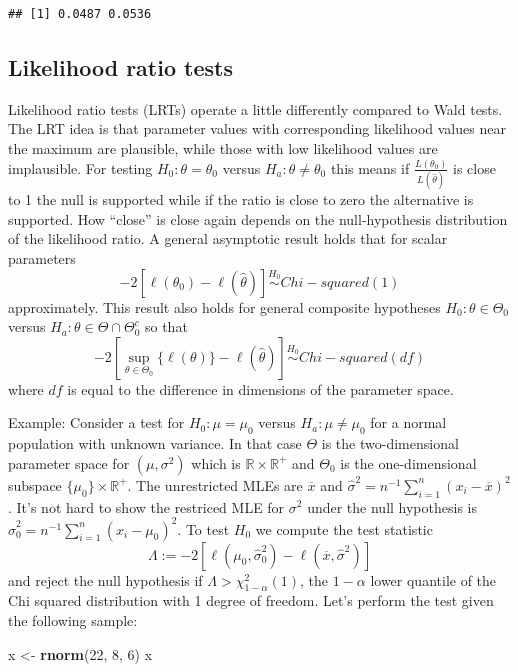 \documentclass[]{book}
\newenvironment{Shaded}{\begin{snugshade}}{\end{snugshade}}
\newcommand{\KeywordTok}[1]{\textcolor[rgb]{0.13,0.29,0.53}{\textbf{{#1}}}}
\newcommand{\DecValTok}[1]{\textcolor[rgb]{0.00,0.00,0.81}{{#1}}}
\newcommand{\StringTok}[1]{\textcolor[rgb]{0.31,0.60,0.02}{{#1}}}
\newcommand{\NormalTok}[1]{{#1}}
\begin{document}
\begin{verbatim}
## [1] 0.0487 0.0536
\end{verbatim}

\subsection{Likelihood ratio tests}\label{likelihood-ratio-tests}

Likelihood ratio tests (LRTs) operate a little differently compared to
Wald tests. The LRT idea is that parameter values with corresponding
likelihood values near the maximum are plausible, while those with low
likelihood values are implausible. For testing \(H_0:\theta = \theta_0\)
versus \(H_a:\theta\ne \theta_0\) this means if
\(\frac{L(\theta_0)}{L(\hat\theta)}\) is close to 1 the null is
supported while if the ratio is close to zero the alternative is
supported. How ``close'' is close again depends on the null-hypothesis
distribution of the likelihood ratio. A general asymptotic result holds
that for scalar parameters
\[-2[\ell(\theta_0) - \ell(\hat\theta)] \stackrel{H_0}{\sim} Chi-squared(1)\]
approximately. This result also holds for general composite hypotheses
\(H_0:\theta\in \Theta_0\) versus
\(H_a: \theta\in \Theta \cap \Theta_0^c\) so that
\[-2[\sup_{\theta\in \Theta_0}\{\ell(\theta)\} - \ell(\hat\theta)]\stackrel{H_0}{\sim} Chi-squared(df)\]
where \(df\) is equal to the difference in dimensions of the parameter
space.

Example: Consider a test for \(H_0:\mu = \mu_0\) versus
\(H_a:\mu \ne \mu_0\) for a normal population with unknown variance. In
that case \(\Theta\) is the two-dimensional parameter space for
\((\mu, \sigma^2)\) which is \(\mathbb{R}\times \mathbb{R}^+\) and
\(\Theta_0\) is the one-dimensional subspace
\(\{\mu_0\}\times \mathbb{R}^+\). The unrestricted MLEs are
\(\overline x\) and
\(\hat\sigma^2 = n^{-1}\sum_{i=1}^n(x_i - \overline x)^2\). It's not
hard to show the restriced MLE for \(\sigma^2\) under the null
hypothesis is \(\hat\sigma_0^2 = n^{-1}\sum_{i=1}^n (x_i - \mu_0)^2\).
To test \(H_0\) we compute the test statistic
\[\Lambda := -2[\ell(\mu_0, \hat\sigma_0^2) - \ell(\overline x, \hat\sigma^2)]\]
and reject the null hypothesis if \(\Lambda > \chi^2_{1-\alpha}(1)\),
the \(1-\alpha\) lower quantile of the Chi squared distribution with 1
degree of freedom. Let's perform the test given the following sample:

\begin{Shaded}
\begin{Highlighting}[]
\NormalTok{x <-}\StringTok{ }\KeywordTok{rnorm}\NormalTok{(}\DecValTok{22}\NormalTok{, }\DecValTok{8}\NormalTok{, }\DecValTok{6}\NormalTok{)}
\NormalTok{x}
\end{Highlighting}
\end{Shaded}
\end{document}
